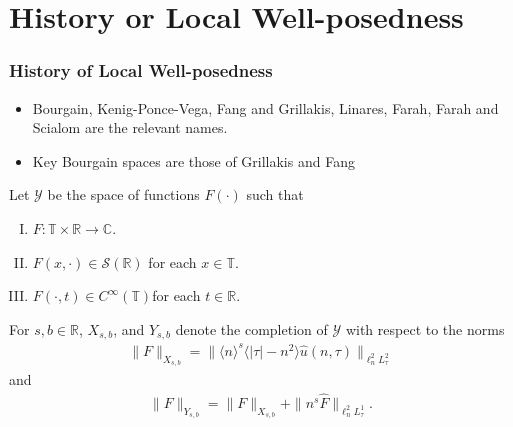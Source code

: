 \documentclass{beamer}
\numberwithin{equation*}{section}
\newcommand{\rr}{\mathbb{R}}
\newcommand{\cc}{\mathbb{C}}
\newcommand{\ci}{\mathbb{T}}
\newcommand{\wh}{\widehat}
\begin{document}
\section{History or Local Well-posedness}
\begin{frame}
  \frametitle{History of Local Well-posedness}
  \begin{itemize}
  \item{}
  Bourgain, Kenig-Ponce-Vega, Fang and Grillakis, Linares, Farah, Farah and Scialom are the relevant names.
  \pause
  \item{}
  Key Bourgain spaces are those of Grillakis and Fang
  \end{itemize}
  \end{frame}
 \begin{frame} 
  \begin{definition}
Let $\mathcal{Y}$ be the space of functions $F(\cdot)$ such that
\begin{enumerate}[(I)]
\item{$F: \ci \times \rr \to \cc$}.
\item{$F(x, \cdot) \in \mathcal{S}(\rr)$ for each $x \in \ci$}.
\item{$F(\cdot, t) \in C^{\infty}(\ci)$for each $t \in \rr$}.
\end{enumerate}
For $s, b \in \rr$, $X_{s,b}$, and $Y_{s,b}$ denote the completion of $\mathcal{Y}$ with
respect to the norms
\begin{gather*}
\|F\|_{X_{s,b}} = \| \langle n \rangle ^{s} \langle | \tau | - n^{2} \rangle \wh{u}(n, \tau) \|_{\ell^{2}_{n}L^{2}_{\tau}}
\end{gather*}
and
\begin{gather*}
\|F\|_{Y_{s,b}} = \|F\|_{X_{s,b}} + \|n^s \wh{F}\|_{\ell^{2}_{n} L^1_\tau }.
\end{gather*}
\end{definition}
\end{frame}
\end{document}

